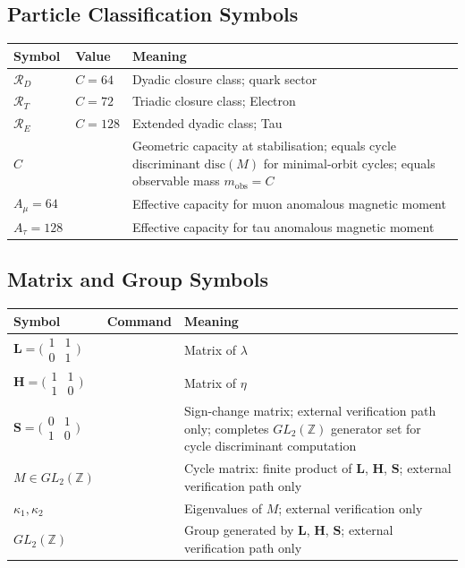 \documentclass[11pt, letterpaper]{article}
\newcommand{\Z}{\mathbb{Z}}
\newcommand{\lop}{\lambda}
\newcommand{\aop}{\eta}
\theoremstyle{definition}
\theoremstyle{plain}
\begin{document}
\subsection{Particle Classification Symbols}

\begin{longtable}{L{2.5cm} L{2.3cm} L{8.3cm}}
\toprule
\textbf{Symbol} & \textbf{Value} & \textbf{Meaning} \\
\midrule\endhead\bottomrule\endfoot

$\mathcal{R}_D$ & $C=64$ & Dyadic closure class; quark sector \\[3pt]
$\mathcal{R}_T$ & $C=72$ & Triadic closure class; Electron \\[3pt]
$\mathcal{R}_E$ & $C=128$ & Extended dyadic class; Tau \\[3pt]
$C$ & & Geometric capacity at stabilisation; equals cycle discriminant
  $\mathrm{disc}(M)$ for minimal-orbit cycles;
  equals observable mass $m_{\mathrm{obs}}=C$ \\[3pt]
$A_\mu=64$ & & Effective capacity for muon anomalous magnetic moment \\[3pt]
$A_\tau=128$ & & Effective capacity for tau anomalous magnetic moment \\[3pt]
\end{longtable}

\subsection{Matrix and Group Symbols}

\begin{longtable}{L{2.5cm} L{2.6cm} L{8.5cm}}
\toprule
\textbf{Symbol} & \textbf{Command} & \textbf{Meaning} \\
\midrule\endhead\bottomrule\endfoot

$\mathbf{L}=\bigl(\begin{smallmatrix}1&1\\0&1\end{smallmatrix}\bigr)$ & &
  Matrix of $\lop$ \\[3pt]
$\mathbf{H}=\bigl(\begin{smallmatrix}1&1\\1&0\end{smallmatrix}\bigr)$ & &
  Matrix of $\aop$ \\[3pt]
$\mathbf{S}=\bigl(\begin{smallmatrix}0&1\\1&0\end{smallmatrix}\bigr)$ & &
  Sign-change matrix; external verification path only;
  completes $GL_2(\Z)$ generator set for cycle discriminant computation \\[3pt]
$M\in GL_2(\Z)$ & & Cycle matrix:
  finite product of $\mathbf{L}$, $\mathbf{H}$, $\mathbf{S}$;
  external verification path only \\[3pt]
$\kappa_1,\kappa_2$ & & Eigenvalues of $M$; external verification only \\[3pt]
$GL_2(\Z)$ & & Group generated by $\mathbf{L}$, $\mathbf{H}$, $\mathbf{S}$;
  external verification path only \\[3pt]
\end{longtable}
\end{document}

